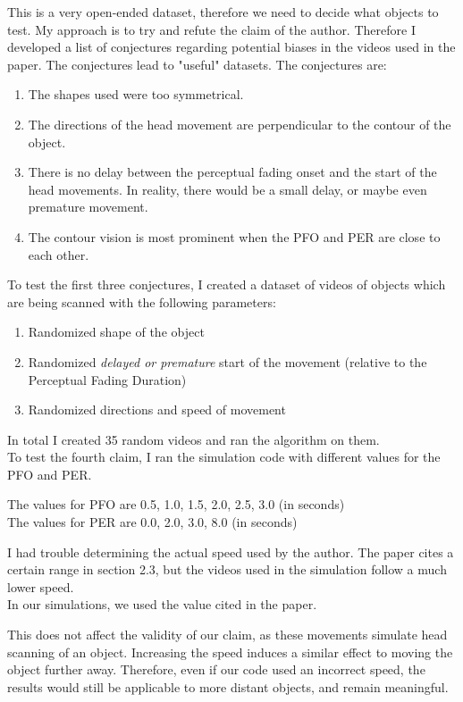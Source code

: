 \documentclass[]{article}
\begin{document}
This is a very open-ended dataset, therefore we need to decide what objects to test. My approach is to try and refute the claim of the author. Therefore I developed a list of conjectures regarding potential biases in the videos used in the paper. The conjectures lead to "useful" datasets. 
The conjectures are:
\begin{enumerate}
	\item The shapes used were too symmetrical.
	\item The directions of the head movement are perpendicular to the contour of the object.
	\item There is no delay between the perceptual fading onset and the start of the head movements. In reality, there would be a small delay, or maybe even premature movement.
	
	\item The contour vision is most prominent when the PFO and PER are close to each other.

\end{enumerate}
To test the first three conjectures, I created a dataset of videos of objects which are being scanned with the following parameters:
\begin{enumerate}
	\item Randomized shape of the object
	\item Randomized {\it delayed or premature} start of the movement (relative to the Perceptual Fading Duration)
	\item Randomized directions and speed of movement
\end{enumerate}
In total I created 35 random videos and ran the algorithm on them. \\
To test the fourth claim, I ran the simulation code with different values for the PFO and PER.

The values for PFO are 0.5, 1.0, 1.5, 2.0, 2.5, 3.0 (in seconds)\\
The values for PER are 0.0, 2.0, 3.0, 8.0 (in seconds)

\begin{remark}
	I had trouble determining the actual speed used by the author. The paper cites a certain range in section 2.3, but the videos used in the simulation follow a much lower speed. \\
	In our simulations, we used the value cited in the paper.
	
	This does not affect the validity of our claim, as these movements simulate head scanning of an object. Increasing the speed induces a similar effect to moving the object further away. Therefore, even if our code used an incorrect speed, the results would still be applicable to more distant objects, and remain meaningful.
\end{remark}
\end{document}
